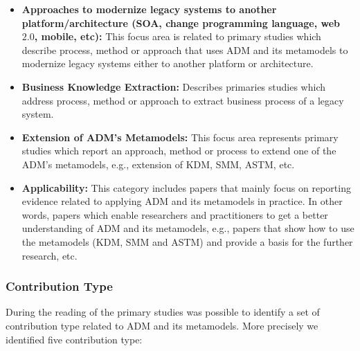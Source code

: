 \begin{itemize}

\item \textbf{Approaches to modernize legacy systems to another platform/architecture (SOA, change programming language, web $2.0$, mobile, etc):} This focus area is related to primary studies which describe process, method or approach that uses ADM and its metamodels to modernize legacy systems either to another platform  or architecture.

\item \textbf{Business Knowledge Extraction:} Describes primaries studies which address process, method or approach to extract business process of a legacy system.

\item \textbf{Extension of ADM's Metamodels:} This focus area represents primary studies which report an approach, method or process to extend one of the ADM's metamodels, e.g., extension of KDM, SMM, ASTM, etc. 

\item \textbf{Applicability:} This category includes papers that mainly focus on reporting evidence related to applying ADM and its metamodels in practice. In other words, papers which enable researchers and practitioners to get a better understanding of ADM and its metamodels, e.g., papers that show how to use the metamodels (KDM, SMM and ASTM) and provide a basis for the further research, etc.


\end{itemize}


\subsubsection{Contribution Type}


During the reading of the primary studies was possible to identify a set of contribution type related to ADM and its metamodels. More precisely we identified five contribution type:

